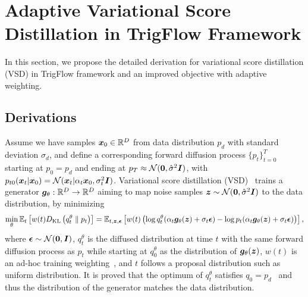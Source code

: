 \section{Adaptive Variational Score Distillation in TrigFlow Framework}
\label{appendix:vsd}
In this section, we propose the detailed derivation for variational score distillation (VSD) in TrigFlow framework and an improved objective with adaptive weighting.

\subsection{Derivations}
Assume we have samples ${\bm{x}}_0\in\mathbb{R}^D$ from data distribution $p_d$ with standard deviation $\sigma_d$, and define a corresponding forward diffusion process $\{p_t\}_{t=0}^T$ starting at $p_0 = p_d$ and ending at $p_T \approx {\mathcal{N}}({\bm{0}}, \hat\sigma^2{\bm{I}})$, with $p_{t0}({\bm{x}}_t|{\bm{x}}_0) = {\mathcal{N}}({\bm{x}}_t|\alpha_t{\bm{x}}_0, \sigma_t^2{\bm{I}})$. Variational score distillation (VSD)~\citep{wang2024prolificdreamer,yin2024dmd,yin2024dmd2} trains a generator ${\bm{g}}_\theta: \mathbb{R}^D\rightarrow \mathbb{R}^D$ aiming to map noise samples ${\bm{z}}\sim {\mathcal{N}}({\bm{0}}, \hat\sigma^2{\bm{I}})$ to the data distribution, by minimizing
\begin{equation*}
    \min_\theta \mathbb{E}_{t}\left[w(t) D_{\text{KL}}\left(q_t^\theta \parallel p_t\right)\right] = \mathbb{E}_{t,{\bm{z}},\bm{\epsilon}}\left[
        w(t) \left(\log q_t^{\theta}(\alpha_t{\bm{g}}_\theta({\bm{z}}) + \sigma_t \bm{\epsilon}) - \log p_t(\alpha_t{\bm{g}}_\theta({\bm{z}}) + \sigma_t\bm{\epsilon})\right)
    \right],
\end{equation*}
where $\bm{\epsilon}\sim {\mathcal{N}}({\bm{0}},{\bm{I}})$, $q_t^\theta$ is the diffused distribution at time $t$ with the same forward diffusion process as $p_t$ while starting at $q^\theta_0$ as the distribution of ${\bm{g}}_\theta({\bm{z}})$, $w(t)$ is an ad-hoc training weighting~\citep{poole2022dreamfusion,wang2024prolificdreamer,yin2024dmd}, and $t$ follows a proposal distribution such as uniform distribution. It is proved that the optimum of $q_t^\theta$ satisfies $q_0 = p_d$~\citep{wang2024prolificdreamer} and thus the distribution of the generator matches the data distribution. 

